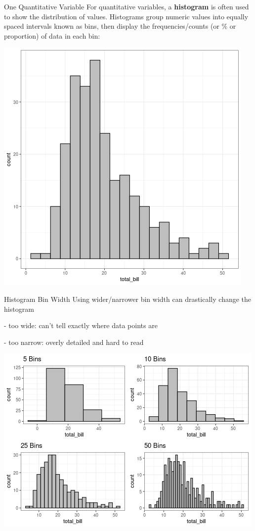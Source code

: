 \documentclass{beamer}
\begin{document}
\begin{frame}{One Quantitative Variable}
For quantitative variables, a \textbf{histogram} is often used to show the distribution of values. Histograms group numeric values into equally spaced intervals known as bins, then display the frequencies/counts (or \% or proportion) of data in each bin:

\begin{center}
\includegraphics[scale=0.35]{img/bill_bin_20.png}
\end{center}
\end{frame}

\begin{frame}{Histogram Bin Width}
Using wider/narrower bin width can drastically change the histogram

    - too wide: can't tell exactly where data points are
    
    - too narrow: overly detailed and hard to read
\begin{center}
\includegraphics[scale=0.5]{img/bin_grid.png}
\end{center}
\end{frame}
\end{document}
